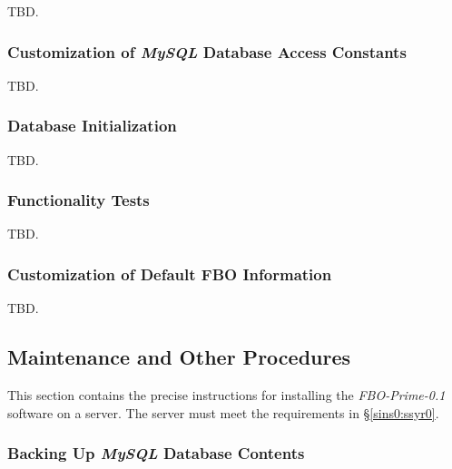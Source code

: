\documentclass[letterpaper,10pt,titlepage]{article}
\newcommand{\productbasename}{FBO-Prime}
\newcommand{\productversion}{0.1}
\newcommand{\productname}{\productbasename{}-\productversion}
\begin{document}
TBD.


\subsubsection{Customization of \emph{MySQL} Database Access Constants}
\label{sins0:sssi0:sdac0}

TBD.


\subsubsection{Database Initialization}
\label{sins0:sssi0:sdin0}

TBD.


\subsubsection{Functionality Tests}
\label{sins0:sssi0:sftt0}

TBD.


\subsubsection{Customization of Default FBO Information}
\label{sins0:sssi0:scdf0}

TBD.


\subsection{Maintenance and Other Procedures}
\label{sins0:smpr0}

This section contains the precise instructions for installing the
\emph{\productname{}} software on a server.  The server must meet the
requirements in \S{}\ref{sins0:ssyr0}.


\subsubsection{Backing Up \emph{MySQL} Database Contents}
\label{sins0:smpr0:sbak0}
\end{document}

